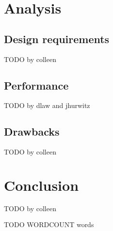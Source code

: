 \documentclass[11pt,titlepage]{article}
\begin{document}
\section{Analysis}

\subsection{Design requirements}

TODO by colleen

\subsection{Performance}

TODO by dlaw and jhurwitz

\subsection{Drawbacks}

TODO by colleen

\section{Conclusion}

TODO by colleen




TODO WORDCOUNT words
\end{document}
